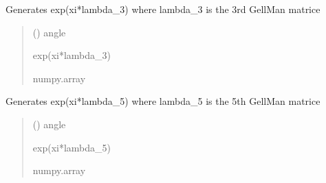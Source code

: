\documentclass[letterpaper,10pt,english]{sphinxmanual}
\begin{document}

\begin{fulllineitems}
\label{\detokenize{gauge_su3:gauge_su3.el_3}}
\pysigstartsignatures
\pysiglinewithargsret
{}
{}
{}
\pysigstopsignatures
\sphinxAtStartPar
Generates exp(xi*lambda\_3) where lambda\_3 is the 3rd Gell\sphinxhyphen{}Man matrice
\begin{quote}\begin{description}
\sphinxAtStartPar
{} () \textendash{} angle

\sphinxAtStartPar
exp(xi*lambda\_3)

\sphinxAtStartPar
numpy.array

\end{description}\end{quote}

\end{fulllineitems}


\begin{fulllineitems}
\label{\detokenize{gauge_su3:gauge_su3.el_5}}
\pysigstartsignatures
\pysiglinewithargsret
{}
{}
{}
\pysigstopsignatures
\sphinxAtStartPar
Generates exp(xi*lambda\_5) where lambda\_5 is the 5th Gell\sphinxhyphen{}Man matrice
\begin{quote}\begin{description}
\sphinxAtStartPar
{} () \textendash{} angle

\sphinxAtStartPar
exp(xi*lambda\_5)

\sphinxAtStartPar
numpy.array

\end{description}\end{quote}

\end{fulllineitems}
\end{document}
